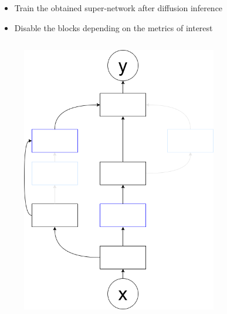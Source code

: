 \documentclass[aspectratio=169,xcolor=dvipsnames]{beamer}
\begin{document}
\begin{frame}
    \begin{itemize}
        \item Train the obtained super-network after diffusion inference
        \item Disable the blocks depending on the metrics of interest
    \end{itemize}
    \begin{columns}[c]
        \begin{figure}[htbp]
            \centering
            \includegraphics[width=.8\textwidth]{diagram_disabled2.drawio.png}
        \end{figure}
        \begin{figure}[htbp]
            \centering

\end{figure}
\end{columns}
\end{frame}
\end{document}
